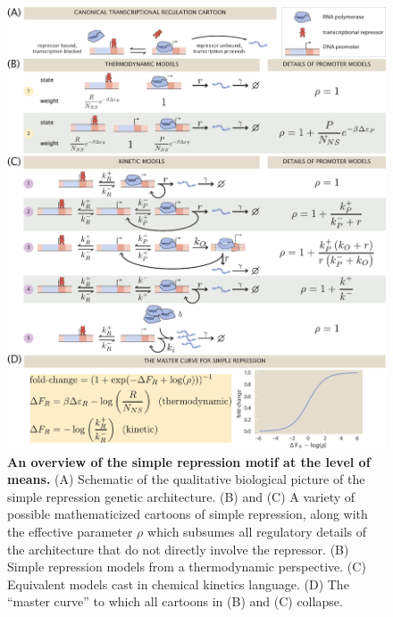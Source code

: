 \afterpage{\clearpage}
\begin{figure}[p]
\centering
\includegraphics[width=\textwidth]{../../figures/main/fig01.pdf}
\caption{\textbf{An overview of the simple repression motif at the level of
means.} (A) Schematic of the qualitative biological picture of the simple
repression genetic architecture. (B) and (C) A variety of possible
mathematicized cartoons of simple repression, along with the effective parameter
$\rho$ which subsumes all regulatory details of the architecture that do not
directly involve the repressor. (B) Simple repression models from a
thermodynamic perspective. (C) Equivalent models cast in chemical kinetics
language. (D) The ``master curve'' to which all cartoons in (B) and (C)
collapse.}
\label{fig1:means_cartoons}
\end{figure}

